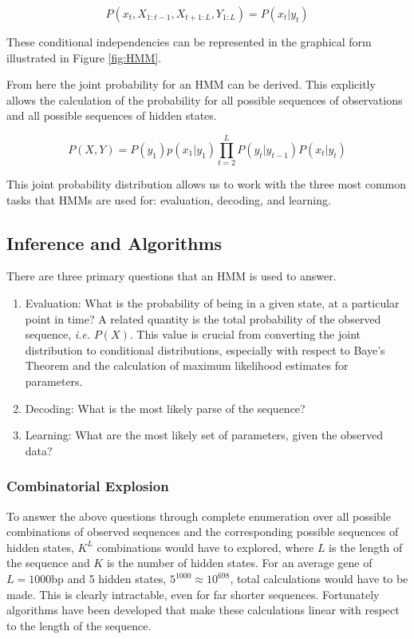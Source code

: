 \begin{equation}
    P(x_t,X_{1:t-1},X_{t+1:L},Y_{1:L}) = P(x_t|y_t)
\end{equation}

These conditional independencies can be represented in the graphical form illustrated in Figure \ref{fig:HMM}. 

From here the joint probability for an HMM can be derived. This explicitly allows the calculation of the probability for all possible sequences of observations and all possible sequences of hidden states. 

\begin{equation}
    P(X,Y) = P(y_1)p(x_1|y_1)\prod_{t=2}^L{P(y_t|y_{t-1})P(x_t|y_t)}
\label{eq:jointhmm}
\end{equation}

This joint probability distribution allows us to work with the three most common tasks that HMMs are used for: evaluation, decoding, and learning.
\subsection{Inference and Algorithms}
There are three primary questions that an HMM is used to answer. 

\begin{enumerate}
    \item Evaluation: What is the probability of being in a given state, at a particular point in time? A related quantity is the total probability of the observed sequence, \emph{i.e.} $P(X)$. This value is crucial from converting the joint distribution to conditional distributions, especially with respect to Baye's Theorem and the calculation of maximum likelihood estimates for parameters.
    \item Decoding: What is the most likely parse of the sequence? 
    \item Learning: What are the most likely set of parameters, given the observed data?
\end{enumerate}

\subsubsection{Combinatorial Explosion}
To answer the above questions through complete enumeration over all possible combinations of observed sequences and the corresponding possible sequences of hidden states, $K^L$ combinations would have to explored, where $L$ is the length of the sequence and $K$ is the number of hidden states. For an average gene of $L=1000$bp and 5 hidden states, $5^{1000}\approx10^{698}$, total calculations would have to be made. This is clearly intractable, even for far shorter sequences. Fortunately algorithms have been developed that make these calculations linear with respect to the length of the sequence.
